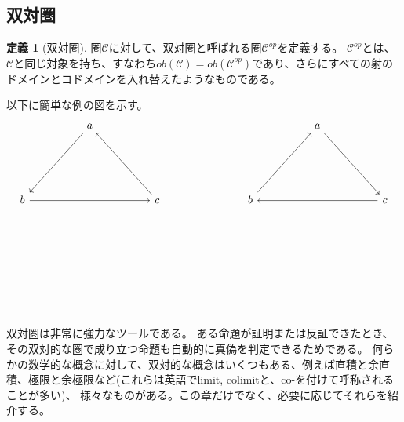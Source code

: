 \documentclass[unicode,12pt,report]{ltjsarticle}
\theoremstyle{definition}
\newtheorem{definition}{定義}[section]
\begin{document}
\subsection{双対圏}
\begin{definition}[双対圏] 

  圏$\mathcal C$に対して、双対圏と呼ばれる圏$\mathcal C^{op}$を定義する。
  $\mathcal C^{op}$とは、$\mathcal C$と同じ対象を持ち、すなわち$ob(\mathcal C) = ob(\mathcal C^{op})$であり、さらにすべての射のドメインとコドメインを入れ替えたようなものである。
\end{definition}
以下に簡単な例の図を示す。
\[\begin{tikzcd}
	&& a &&&&&&& a && \\
	\\
	\\
	b &&&& c &&& b &&&& c \\
	\\
	\\
	\\
	\\
	&&&& {}
	\arrow[from=1-3, to=4-1]
	\arrow[from=1-10, to=4-12]
	\arrow[from=4-1, to=4-5]
	\arrow[from=4-5, to=1-3]
	\arrow[from=4-8, to=1-10]
	\arrow[from=4-12, to=4-8]
\end{tikzcd}\]

双対圏は非常に強力なツールである。
ある命題が証明または反証できたとき、その双対的な圏で成り立つ命題も自動的に真偽を判定できるためである。
何らかの数学的な概念に対して、双対的な概念はいくつもある、例えば直積と余直積、極限と余極限など(これらは英語でlimit, colimitと、co-を付けて呼称されることが多い)、
様々なものがある。この章だけでなく、必要に応じてそれらを紹介する。
\end{document}
